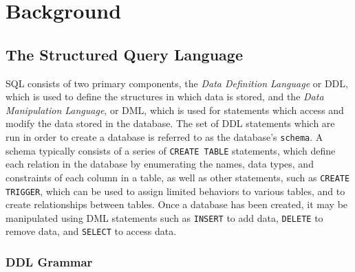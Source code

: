 \section{Background}
\subsection{The Structured Query Language}
SQL consists of two primary components, the \textit{Data Definition Language} or DDL, which is used to define the structures in which data is stored, and the \textit{Data Manipulation Language}, or DML, which is used for statements which access and modify the data stored in the database. The set of DDL statements which are run in order to create a database is referred to as the database's \texttt{schema}. A schema typically consists of a series of \texttt{CREATE TABLE} statements, which define each relation in the database by enumerating the names, data types, and constraints of each column in a table, as well as other statements, such as \texttt{CREATE TRIGGER}, which can be used to assign limited behaviors to various tables, and to create relationships between tables. Once a database has been created, it may be manipulated using DML statements such as \texttt{INSERT} to add data, \texttt{DELETE} to remove data, and \texttt{SELECT} to access data.

\subsubsection{DDL Grammar}

